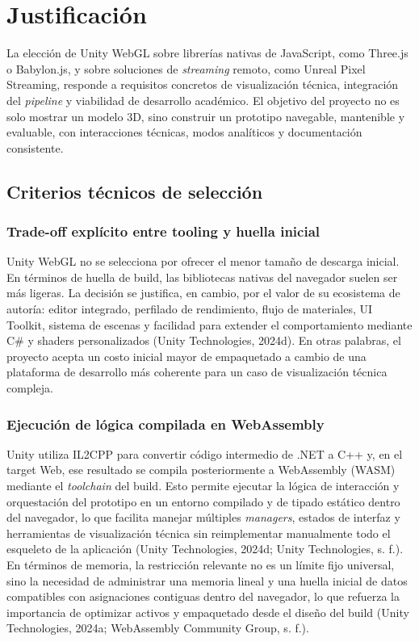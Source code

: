 \section{Justificaci\'on}

La elecci\'on de Unity WebGL sobre librer\'ias nativas de JavaScript, como Three.js o Babylon.js, y sobre soluciones de \textit{streaming} remoto, como Unreal Pixel Streaming, responde a requisitos concretos de visualizaci\'on t\'ecnica, integraci\'on del \textit{pipeline} y viabilidad de desarrollo acad\'emico. El objetivo del proyecto no es solo mostrar un modelo 3D, sino construir un prototipo navegable, mantenible y evaluable, con interacciones t\'ecnicas, modos anal\'iticos y documentaci\'on consistente.

\subsection{Criterios t\'ecnicos de selecci\'on}

\subsubsection{Trade-off expl\'icito entre tooling y huella inicial}

Unity WebGL no se selecciona por ofrecer el menor tama\~no de descarga inicial. En t\'erminos de huella de build, las bibliotecas nativas del navegador suelen ser m\'as ligeras. La decisi\'on se justifica, en cambio, por el valor de su ecosistema de autor\'ia: editor integrado, perfilado de rendimiento, flujo de materiales, UI Toolkit, sistema de escenas y facilidad para extender el comportamiento mediante C\# y shaders personalizados (Unity Technologies, 2024d). En otras palabras, el proyecto acepta un costo inicial mayor de empaquetado a cambio de una plataforma de desarrollo m\'as coherente para un caso de visualizaci\'on t\'ecnica compleja.

\subsubsection{Ejecuci\'on de l\'ogica compilada en WebAssembly}

Unity utiliza IL2CPP para convertir c\'odigo intermedio de .NET a C++ y, en el target Web, ese resultado se compila posteriormente a WebAssembly (WASM) mediante el \textit{toolchain} del build. Esto permite ejecutar la l\'ogica de interacci\'on y orquestaci\'on del prototipo en un entorno compilado y de tipado est\'atico dentro del navegador, lo que facilita manejar m\'ultiples \textit{managers}, estados de interfaz y herramientas de visualizaci\'on t\'ecnica sin reimplementar manualmente todo el esqueleto de la aplicaci\'on (Unity Technologies, 2024d; Unity Technologies, s. f.). En t\'erminos de memoria, la restricci\'on relevante no es un l\'imite fijo universal, sino la necesidad de administrar una memoria lineal y una huella inicial de datos compatibles con asignaciones contiguas dentro del navegador, lo que refuerza la importancia de optimizar activos y empaquetado desde el dise\~no del build (Unity Technologies, 2024a; WebAssembly Community Group, s. f.).


